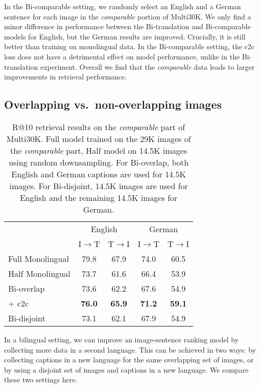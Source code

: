 In the Bi-comparable setting, we randomly select an English and a German sentence for each image in the {\it comparable} portion of Multi30K. We only find a minor difference in performance between the Bi-translation and Bi-comparable models for English, but the German results are improved. Crucially, it is still better than training on monolingual data. In the Bi-comparable setting, the c2c loss does not have a detrimental effect on model performance, unlike in the Bi-translation experiment. Overall we find that the \emph{comparable} data leads to larger improvements in retrieval performance.%



\subsection{Overlapping vs.\ non-overlapping images}
\label{sec:bioverlap}

\begin{table}
\centering
\renewcommand{\arraystretch}{1.3}
\begin{tabular}{lcccc}
\toprule
& \multicolumn{2}{c}{English} &  \multicolumn{2}{c}{German} \\
 & I$\rightarrow$T & T$\rightarrow$I & I$\rightarrow$T & T$\rightarrow$I \\
\midrule
Full Monolingual			& 79.8 & 67.9 & 74.0 & 60.5\\
Half Monolingual			& 73.7 & 61.6 & 66.4 & 53.9 \\
\midrule
Bi-overlap				& 73.6 & 62.2 & 67.6 &  54.9 \\
+ c2c 		& \bf{76.0} & \bf{65.9} & \bf{71.2}  & \bf{59.1}\\
\midrule
Bi-disjoint 	& 73.1 & 62.1 & 67.9 &  54.9\\
\bottomrule
\end{tabular}
\caption{R@10 retrieval results on the \emph{comparable} part of Multi30K. Full model trained on the 29K images of the \emph{comparable} part, Half model on 14.5K images using random downsampling. For Bi-overlap, both English and German captions are used for 14.5K images. For Bi-disjoint, 14.5K images are used for English and the remaining 14.5K images for German.}
\label{tab:half}
\end{table}

In a bilingual setting, we can improve an image-sentence ranking model by collecting more data in a second language. This can be achieved in two ways:  by collecting captions in a new language for the same overlapping set of images, or by  using a disjoint set of images and captions in a new language. We compare these two settings here.

